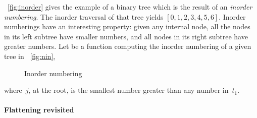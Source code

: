 \Fig~\vref{fig:inorder} gives the example of a binary tree which is
the result of an \emph{inorder numbering}. The inorder traversal of that tree yields
\([0,1,2,3,4,5,6]\). Inorder numberings have an interesting property:
given any internal node, all the nodes in its left subtree have
smaller numbers, and all nodes in its right subtree have greater
numbers. Let 
be a function computing the inorder numbering of a given tree in
\fig~\vref{fig:nin},
\begin{figure}[t]
\centering
{}
\caption{Inorder numbering}
\label{fig:nin}
\end{figure}
where~\(j\), at the root, is the smallest number greater than any
number in~\(t_1\).

\paragraph{Flattening revisited}
\label{par:rotation}

